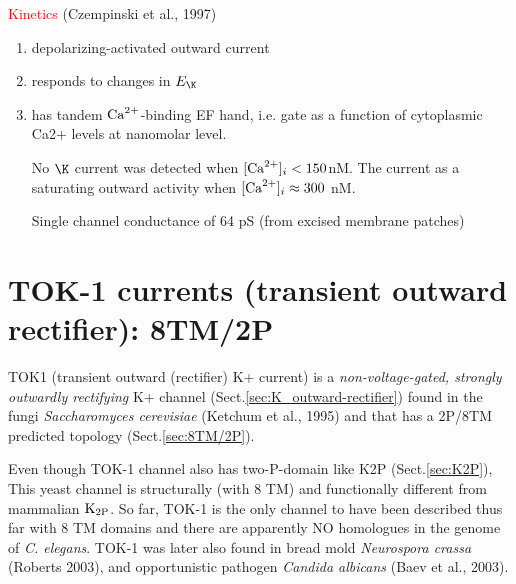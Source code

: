\textcolor{red}{Kinetics} (Czempinski et al., 1997)
\begin{enumerate}
  
  \item depolarizing-activated outward current
  
  \item responds to changes in $E_\K$

  \item has tandem ${\text{Ca}^{2+}}$-binding EF hand, i.e. gate as a function of
  cytoplasmic Ca2+ levels at nanomolar level.
  
  No $\K$ current was detected when $[{\text{Ca}^{2+}}]_i < 150 $nM. The current as a
  saturating outward activity when $[{\text{Ca}^{2+}}]_i \approx 300 $ nM.
  
  Single channel conductance of 64 pS (from excised membrane patches)
  
\end{enumerate}

\section{TOK-1 currents (transient outward rectifier): 8TM/2P}
\label{sec:TOK-1_current}
\label{sec:TOK}

TOK1 (transient outward (rectifier) K+ current) is a {\it non-voltage-gated,
strongly outwardly rectifying} K+ channel (Sect.\ref{sec:K_outward-rectifier})
found in the fungi {\it Saccharomyces cerevisiae} (Ketchum et al., 1995) and
that has a 2P/8TM predicted topology (Sect.\ref{sec:8TM/2P}).

Even though TOK-1 channel also has two-P-domain like K2P (Sect.\ref{sec:K2P}),
This yeast channel is structurally (with 8 TM) and functionally different from
mammalian ${\text{K}_{\text{2P}}}$. So far, TOK-1 is the only channel to have been described
thus far with 8 TM domains and there are apparently NO homologues in the genome
of {\it C. elegans}. TOK-1 was later also found in bread mold {\it Neurospora
crassa} (Roberts 2003), and opportunistic pathogen {\it Candida albicans} (Baev
et al., 2003).



